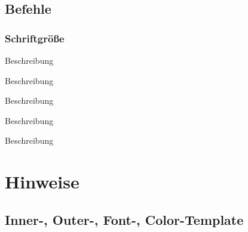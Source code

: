 \documentclass[cmyk,a4paper,colorscheme=green,TUBStitlepage=picture]{tubsreprt}
\begin{document}





\section{Befehle}


\subsection{Schriftgröße}

\begin{classoption}{9pt}
  Beschreibung
\end{classoption}

\begin{classoption}{10pt}
  Beschreibung
\end{classoption}

\begin{classoption}{11pt}
  Beschreibung
\end{classoption}

\begin{classoption}{12pt}
  Beschreibung
\end{classoption}

\begin{classoption}{14pt}
  Beschreibung
\end{classoption}


\chapter{Hinweise}

\section{Inner-, Outer-, Font-, Color-Template}
\end{document}
